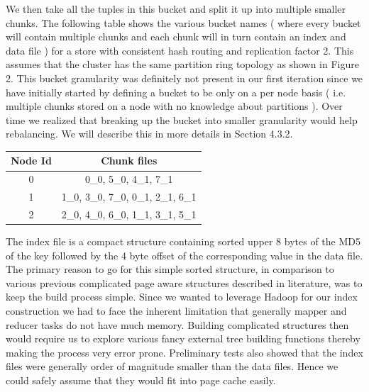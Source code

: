 \documentclass[10pt,twocolumn,preprint,natbib,authoryear]{sigplanconf}
\begin{document}
We then take all the tuples in this bucket and split it up into multiple smaller chunks. The following table shows the various bucket names ( where every bucket will contain multiple chunks and each chunk will in turn contain an index and data file ) for a store with consistent hash routing and replication factor 2. This assumes that the cluster has the same partition ring topology as shown in Figure 2. This bucket granularity was definitely not present in our first iteration since we have initially started by defining a bucket to be only on a per node basis ( i.e. multiple chunks stored on a node with no knowledge about partitions ). Over time we realized that breaking up the bucket into smaller granularity would help rebalancing. We will describe this in more details in Section 4.3.2. 

\begin{center}
    \begin{tabular}{ | c | c | }
    \hline
    Node Id & Chunk files \\ \hline
    0 &  0\_0, 5\_0, 4\_1, 7\_1 \\
   1 &   1\_0, 3\_0, 7\_0, 0\_1, 2\_1, 6\_1 \\
   2 &    2\_0, 4\_0, 6\_0, 1\_1, 3\_1, 5\_1  \\
\hline
    \end{tabular}
\end{center}


The index file is a compact structure containing sorted upper 8 bytes of the MD5 of the key followed by the 4 byte offset of the corresponding value in the data file. The primary reason to go for this simple sorted structure, in comparison to various previous complicated page aware structures described in literature, was to keep the build process simple. Since we wanted to leverage Hadoop for our index construction we had to face the inherent limitation that generally mapper and reducer tasks do not have much memory. Building complicated structures then would require us to explore various fancy external tree building functions thereby making the process very error prone. Preliminary tests also showed that the index files were generally order of magnitude smaller than the data files. Hence we could safely assume that they would fit into page cache easily. 
\end{document}

